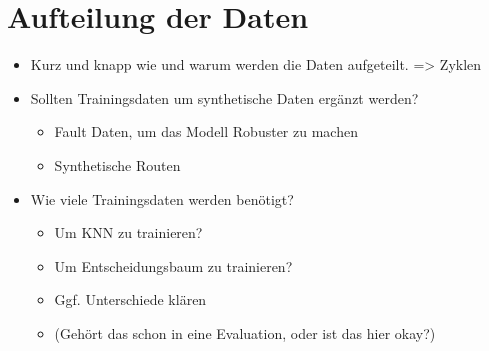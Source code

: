 \section{Aufteilung der Daten}
\begin{itemize}
    \item Kurz und knapp wie und warum werden die Daten aufgeteilt. => Zyklen
    \item Sollten Trainingsdaten um synthetische Daten ergänzt werden?
    \begin{itemize}
        \item Fault Daten, um das Modell Robuster zu machen
        \item Synthetische Routen
    \end{itemize}
    \item Wie viele Trainingsdaten werden benötigt?
    \begin{itemize}
        \item Um KNN zu trainieren?
        \item Um Entscheidungsbaum zu trainieren?
        \item Ggf. Unterschiede klären
        \item (Gehört das schon in eine Evaluation, oder ist das hier okay?)
    \end{itemize}
\end{itemize}